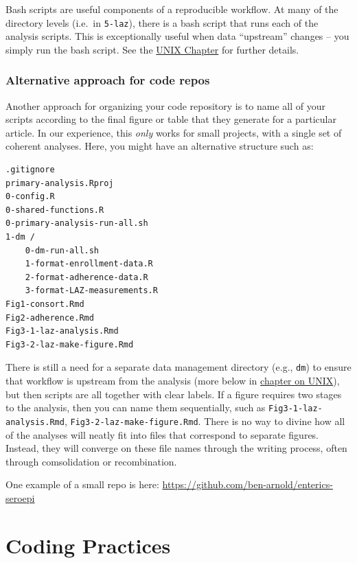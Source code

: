 \documentclass[]{book}
\begin{document}
Bash scripts are useful components of a reproducible workflow. At many of the directory levels (i.e.~in \texttt{5-laz}), there is a bash script that runs each of the analysis scripts. This is exceptionally useful when data ``upstream'' changes -- you simply run the bash script. See the \protect\hyperlink{unix}{UNIX Chapter} for further details.

\hypertarget{alternative-approach-for-code-repos}{%
\subsection{Alternative approach for code repos}\label{alternative-approach-for-code-repos}}

Another approach for organizing your code repository is to name all of your scripts according to the final figure or table that they generate for a particular article. In our experience, this \emph{only} works for small projects, with a single set of coherent analyses. Here, you might have an alternative structure such as:

\begin{verbatim}
.gitignore
primary-analysis.Rproj
0-config.R
0-shared-functions.R
0-primary-analysis-run-all.sh
1-dm /
    0-dm-run-all.sh
    1-format-enrollment-data.R
    2-format-adherence-data.R
    3-format-LAZ-measurements.R
Fig1-consort.Rmd
Fig2-adherence.Rmd
Fig3-1-laz-analysis.Rmd
Fig3-2-laz-make-figure.Rmd
\end{verbatim}

There is still a need for a separate data management directory (e.g., \texttt{dm}) to ensure that workflow is upstream from the analysis (more below in \protect\hyperlink{unix}{chapter on UNIX}), but then scripts are all together with clear labels. If a figure requires two stages to the analysis, then you can name them sequentially, such as \texttt{Fig3-1-laz-analysis.Rmd}, \texttt{Fig3-2-laz-make-figure.Rmd}. There is no way to divine how all of the analyses will neatly fit into files that correspond to separate figures. Instead, they will converge on these file names through the writing process, often through comsolidation or recombination.

One example of a small repo is here:
\url{https://github.com/ben-arnold/enterics-seroepi}

\hypertarget{codingpractices}{%
\chapter{Coding Practices}\label{codingpractices}}
\end{document}
